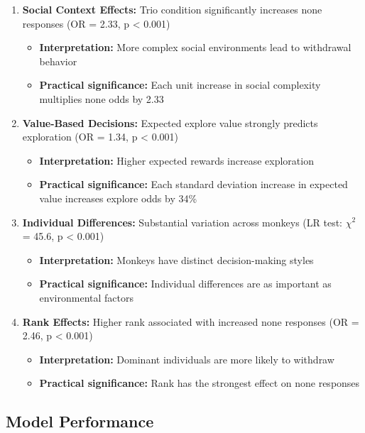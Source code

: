 \documentclass[11pt]{article}
\begin{document}
\begin{enumerate}
    \item \textbf{Social Context Effects:} Trio condition significantly increases none responses (OR = 2.33, p < 0.001)
    \begin{itemize}
        \item \textbf{Interpretation:} More complex social environments lead to withdrawal behavior
        \item \textbf{Practical significance:} Each unit increase in social complexity multiplies none odds by 2.33
    \end{itemize}
    
    \item \textbf{Value-Based Decisions:} Expected explore value strongly predicts exploration (OR = 1.34, p < 0.001)
    \begin{itemize}
        \item \textbf{Interpretation:} Higher expected rewards increase exploration
        \item \textbf{Practical significance:} Each standard deviation increase in expected value increases explore odds by 34\%
    \end{itemize}
    
    \item \textbf{Individual Differences:} Substantial variation across monkeys (LR test: $\chi^2$ = 45.6, p < 0.001)
    \begin{itemize}
        \item \textbf{Interpretation:} Monkeys have distinct decision-making styles
        \item \textbf{Practical significance:} Individual differences are as important as environmental factors
    \end{itemize}
    
    \item \textbf{Rank Effects:} Higher rank associated with increased none responses (OR = 2.46, p < 0.001)
    \begin{itemize}
        \item \textbf{Interpretation:} Dominant individuals are more likely to withdraw
        \item \textbf{Practical significance:} Rank has the strongest effect on none responses
    \end{itemize}
\end{enumerate}

\subsection{Model Performance}
\end{document}

